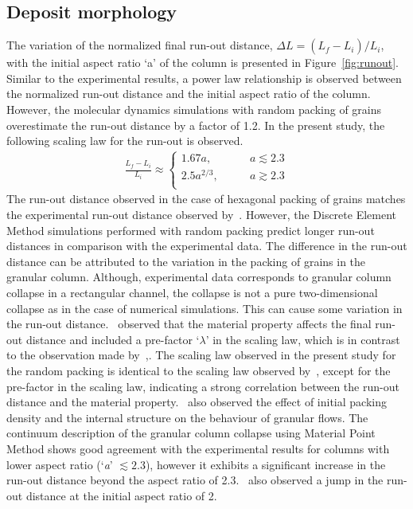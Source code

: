 \subsection{Deposit morphology}
The variation of the normalized final run-out distance, $\Delta L = 
(L_{\textit{f}}-L_{\textit{i}})/L_{\textit{i}}$, with the initial aspect ratio 
`a' of the column is presented in Figure~\ref{fig:runout}. Similar to the 
experimental results, a power law relationship is observed between the 
normalized run-out distance and the initial aspect ratio of the column. 
However, the molecular dynamics simulations with random packing of grains 
overestimate the run-out distance by a factor of 1.2. In the present study, the 
following scaling law for the run-out is observed.
\begin{align}
\frac{L_{\textit{f}}-L_{\textit{i}}}{L_{\textit{i}}} \approx  
\begin{cases}
1.67 a, &\qquad \textit{a}\lesssim 2.3 \\
2.5 a^{2/3}, &\qquad \textit{a} \gtrsim 2.3 \\
\end{cases}
\end{align}
The run-out distance observed in the case of hexagonal packing of grains 
matches the experimental run-out distance observed by~\citet{Lajeunesse2004}. 
However, the Discrete Element Method simulations performed with random packing 
predict longer run-out distances in comparison with the experimental data. The 
difference in the run-out distance can be attributed to the variation in the 
packing of grains in the granular column. Although, experimental data 
corresponds to granular column collapse in a rectangular channel, the collapse 
is not a pure two-dimensional collapse as in the case of numerical simulations. 
This can cause some variation in the run-out distance.~\citet{Balmforth2005} 
observed that the material property affects the final run-out distance and 
included a pre-factor `$\lambda$' in the scaling law, which is in contrast to 
the observation made by~\citet{Lube2005},. The scaling law observed in the 
present study for the random packing is identical to the scaling law observed 
by~\citet{Lajeunesse2004}, except for the pre-factor in the scaling law, 
indicating a strong correlation between the run-out distance and the material 
property.~\citet{Daerr1999} also observed the effect of initial packing density 
and the internal structure on the behaviour of granular flows. The continuum 
description of the granular column collapse using Material Point Method shows 
good agreement with the experimental results for columns with lower aspect 
ratio (`\textit{a}' $\lesssim 2.3$), however it exhibits a significant increase 
in the run-out distance beyond the aspect ratio of 2.3.~\citet{Bandara2013} 
also observed a jump in the run-out distance at the initial aspect ratio of 2.

